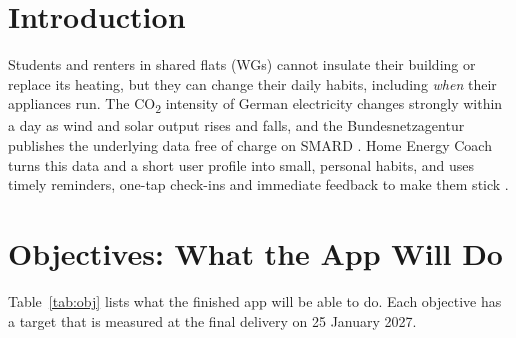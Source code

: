 \documentclass[10pt,twocolumn,letterpaper]{article}
\newcommand{\cotwo}{CO\textsubscript{2}}
\begin{document}
\section{Introduction}
Students and renters in shared flats (WGs) cannot insulate their building or replace its heating, but they can change their daily habits, including \emph{when} their appliances run. The \cotwo{} intensity of German electricity changes strongly within a day as wind and solar output rises and falls, and the Bundesnetzagentur publishes the underlying data free of charge on SMARD \cite{smard}. Home Energy Coach turns this data and a short user profile into small, personal habits, and uses timely reminders, one-tap check-ins and immediate feedback to make them stick \cite{fogg,lally}.
 
\section{Objectives: What the App Will Do}
Table~\ref{tab:obj} lists what the finished app will be able to do. Each objective has a target that is measured at the final delivery on 25 January 2027.
 
\end{document}
